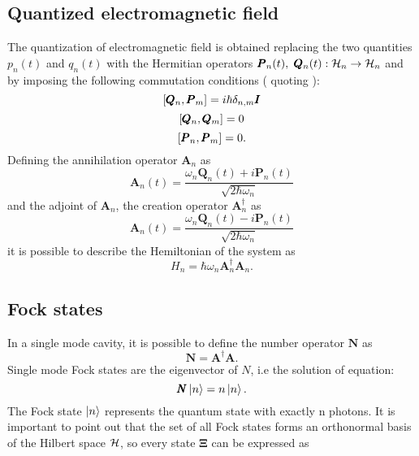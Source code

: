     \subsection{Quantized electromagnetic field}
        The quantization of electromagnetic field is obtained replacing the two quantities 
        $p_n(t)$ and $q_n(t)$ with the Hermitian operators 
        $\pmb{P}_n(t),\ \pmb{Q}_n(t):\Hilbert_n\to\Hilbert_n$ and by imposing the following
        commutation conditions (\cite{tesiGuerrini} quoting \cite{quantumRad_Louissel,quantumOptic_Mandel}):
        \begin{equation}
            \commutator{\pmb{Q}_n}{\pmb{P}_m}=i\hbar\delta_{n,m}\pmb{I}
        \end{equation}
        \begin{equation}
            \commutator{\pmb{Q}_n}{\pmb{Q}_m}=0
        \end{equation}
        \begin{equation}
            \commutator{\pmb{P}_n}{\pmb{P}_m}=0.
        \end{equation}
        Defining the annihilation operator $\pmb{A}_n$ as
        \begin{equation}
            \pmb{A}_n(t)=\frac{\omega_n\pmb{Q}_n(t)+i\pmb{P}_n(t)}{\sqrt{2\hbar\omega_n}}
            \label{eq:QEF.1}
        \end{equation} 
        and the adjoint of $\pmb{A}_n$, the creation operator $\pmb{A}_n^\dagger$ as
        \begin{equation}
            \pmb{A}_n(t)=\frac{\omega_n\pmb{Q}_n(t)-i\pmb{P}_n(t)}{\sqrt{2\hbar\omega_n}}
            \label{eq:QEF.2}
        \end{equation}
        it is possible to describe the Hemiltonian of the system as
        \begin{equation}
            H_n=\hbar\omega_n\pmb{A}_n^\dagger\pmb{A}_n.
            \label{eq:QEF.3}
        \end{equation}

    \subsection{Fock states}
        In a single mode cavity, it is possible to define the number operator $\pmb{N}$ as
        \begin{equation}
            \pmb{N}=\pmb{A}^\dagger \pmb{A}.
        \end{equation}
        Single mode Fock states are the eigenvector of $N$, i.e the solution of equation:
        \begin{equation}
            \pmb{N}\ket{n}=n\ket{n}.
        \end{equation}
        The Fock state $\ket{n}$ represents the quantum state with exactly n photons.
        It is important to point out that the set of all Fock states forms an orthonormal basis
        of the Hilbert space $\mathcal{H}$, so every state $\pmb{\Xi}$ can be expressed as
        
